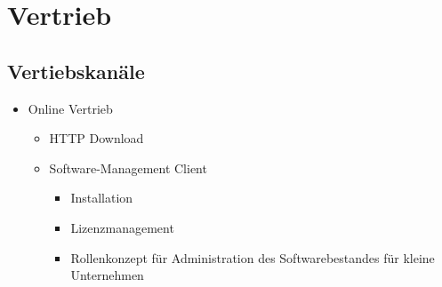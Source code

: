 \chapter{Vertrieb}
	\section{Vertiebskan\"ale}
	\begin{itemize}
		\item Online Vertrieb
		\begin{itemize}
			\item HTTP Download
			\item Software-Management Client
				\begin{itemize}
					\item Installation
					\item Lizenzmanagement
					\item Rollenkonzept f\"ur Administration des Softwarebestandes f\"ur kleine Unternehmen
				\end{itemize}
		\end{itemize}
	\end{itemize}
